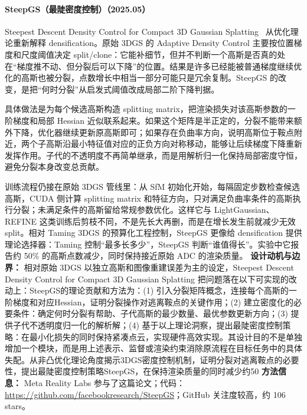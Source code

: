 \paragraph{SteepGS（最陡密度控制）（2025.05）}
Steepest Descent Density Control for Compact 3D Gaussian Splatting~\cite{2505_05587} 从优化理论重新解释 densification。原始 3DGS 的 Adaptive Density Control 主要按位置梯度和尺度阈值决定 split/clone：它能补细节，但并不判断一个高斯是否真的处在“梯度推不动、但分裂后可以下降”的位置。结果是许多已经能被普通梯度继续优化的高斯也被分裂，点数增长中相当一部分可能只是冗余复制。SteepGS 的改变，是把“何时分裂”从启发式阈值改成局部二阶下降判据。

具体做法是为每个候选高斯构造 splitting matrix，把渲染损失对该高斯参数的一阶梯度和局部 Hessian 近似联系起来。如果这个矩阵是半正定的，分裂不能带来额外下降，优化器继续更新原高斯即可；如果存在负曲率方向，说明高斯位于鞍点附近，两个子高斯沿最小特征值对应的正负方向对称移动，能够让后续梯度下降重新发挥作用。子代的不透明度不再简单继承，而是用解析归一化保持局部密度守恒，避免分裂本身改变总贡献。

训练流程仍接在原始 3DGS 管线里：从 SfM 初始化开始，每隔固定步数检查候选高斯，CUDA 侧计算 splitting matrix 和特征方向，只对满足负曲率条件的高斯执行分裂；未满足条件的高斯留给常规参数优化。这样它与 LightGaussian、REFINE 这类训练后剪枝不同，不是先长大再删，而是在增长发生前就减少无效 split。相对 Taming 3DGS 的预算化工程控制，SteepGS 更像给 densification 提供理论选择器：Taming 控制“最多长多少”，SteepGS 判断“谁值得长”。实验中它报告约 50\% 的高斯点数减少，同时保持接近原始 ADC 的渲染质量。
\textbf{设计动机与边界：} 相对原始 3DGS 以独立高斯和图像重建误差为主的设定，Steepest Descent Density Control for Compact 3D Gaussian Splatting 把问题落在以下可实现的改动上：SteepGS的理论贡献和方法为：(1) 引入分裂矩阵概念，连接每个高斯的一阶梯度和对应Hessian，证明分裂操作对逃离鞍点的关键作用；(2) 建立密度化的必要条件：确定何时分裂有帮助、子代高斯的最少数量、最优参数更新方向；(3) 提供子代不透明度归一化的解析解；(4) 基于以上理论洞察，提出最陡密度控制策略：在最小化损失的同时保持紧凑点云，实现硬件高效实现。其设计目的不是单独增加一个模块，而是用上述表示、监督或渲染约束消除原流程在目标任务中的具体失配。从非凸优化理论角度揭示3DGS密度控制机制，证明分裂对逃离鞍点的必要性，提出最陡密度控制策略SteepGS，在保持渲染质量的同时减少约50%
\textbf{方法信息：} Meta Reality Labs 参与了这篇论文；代码：\url{https://github.com/facebookresearch/SteepGS}；GitHub 关注度较高，约 106 stars。



